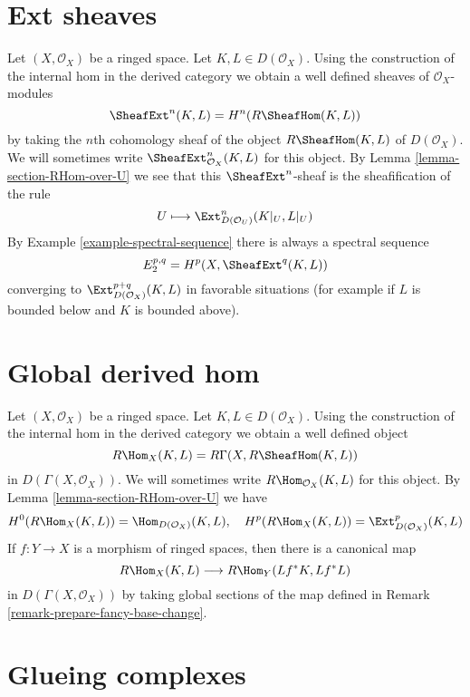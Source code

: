 \section{Ext sheaves}
\label{section-ext}

\noindent
Let $(X, \mathcal{O}_X)$ be a ringed space. Let $K, L \in D(\mathcal{O}_X)$.
Using the construction of the internal hom in the derived category we
obtain a well defined sheaves of $\mathcal{O}_X$-modules
$$
\SheafExt^n(K, L) = H^n(R\SheafHom(K, L))
$$
by taking the $n$th cohomology sheaf of the object $R\SheafHom(K, L)$
of $D(\mathcal{O}_X)$. We will sometimes write
$\SheafExt^n_{\mathcal{O}_X}(K, L)$ for this object.
By Lemma \ref{lemma-section-RHom-over-U}
we see that this $\SheafExt^n$-sheaf
is the sheafification of the rule
$$
U \longmapsto \Ext^n_{D(\mathcal{O}_U)}(K|_U, L|_U)
$$
By Example \ref{example-spectral-sequence} there is always a spectral
sequence
$$
E_2^{p, q} = H^p(X, \SheafExt^q(K, L))
$$
converging to $\Ext^{p + q}_{D(\mathcal{O}_X)}(K, L)$
in favorable situations (for example if $L$ is bounded below and
$K$ is bounded above).





\section{Global derived hom}
\label{section-global-RHom}

\noindent
Let $(X, \mathcal{O}_X)$ be a ringed space. Let $K, L \in D(\mathcal{O}_X)$.
Using the construction of the internal hom in the derived category we
obtain a well defined object
$$
R\Hom_X(K, L) = R\Gamma(X, R\SheafHom(K, L))
$$
in $D(\Gamma(X, \mathcal{O}_X))$. We will sometimes write
$R\Hom_{\mathcal{O}_X}(K, L)$ for this object.
By Lemma \ref{lemma-section-RHom-over-U}
we have
$$
H^0(R\Hom_X(K, L)) = \Hom_{D(\mathcal{O}_X)}(K, L),
\quad
H^p(R\Hom_X(K, L)) = \Ext_{D(\mathcal{O}_X)}^p(K, L)
$$
If $f : Y \to X$ is a morphism of ringed spaces, then there is
a canonical map
$$
R\Hom_X(K, L) \longrightarrow R\Hom_Y(Lf^*K, Lf^*L)
$$
in $D(\Gamma(X, \mathcal{O}_X))$ by taking global sections of the map
defined in Remark \ref{remark-prepare-fancy-base-change}.








\section{Glueing complexes}
\label{section-glueing-complexes}

